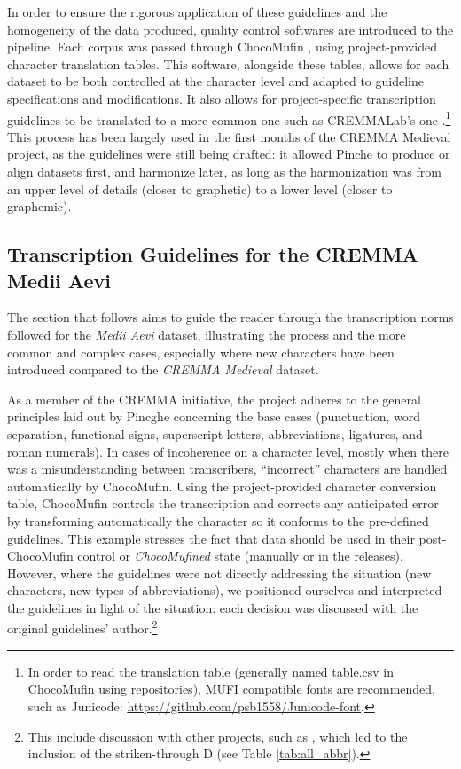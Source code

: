 \documentclass{article}
\begin{document}
In order to ensure the rigorous application of these guidelines and the homogeneity of the data produced, quality control softwares are introduced to the pipeline. Each corpus was passed through ChocoMufin \citep{Clerice_Choco-Mufin_a_tool_2021}, using project-provided character translation tables. This software, alongside these tables, allows for each dataset to be both controlled at the character level and adapted to guideline specifications and modifications. It also allows for project-specific transcription guidelines to be translated to a more common one such as CREMMALab’s one \citep{pinche2022cremmalab}.\footnote{In order to read the translation  table (generally named table.csv in ChocoMufin using repositories), MUFI compatible fonts are recommended, such as Junicode: \url{https://github.com/psb1558/Junicode-font}.} This process has been largely used in the first months of the CREMMA Medieval project, as the guidelines were still being drafted: it allowed Pinche to produce or align datasets first, and harmonize later, as long as the harmonization was from an upper level of details (closer to graphetic) to a lower level (closer to graphemic).

\subsection{Transcription Guidelines for the CREMMA Medii Aevi}

The section that follows aims to guide the reader through the transcription norms followed for the \textit{Medii Aevi} dataset, illustrating the process and the more common and complex cases, especially where new characters have been introduced compared to the \textit{CREMMA Medieval} dataset.

As a member of the CREMMA initiative, the project adheres to the general principles laid out by Pincghe \cite[Tables pp.~4-15]{pinche:hal-03697382} concerning the base cases (punctuation, word separation, functional signs, superscript letters, abbreviations, ligatures, and roman numerals). In cases of incoherence on a character level, mostly when there was a misunderstanding between transcribers, \enquote{incorrect} characters are handled automatically by ChocoMufin. Using the project-provided character conversion table, ChocoMufin controls the transcription and corrects any anticipated error by transforming automatically the character so it conforms to the pre-defined guidelines. This example stresses the fact that data should be used in their post-ChocoMufin control or \textit{ChocoMufined} state (manually or in the releases). However, where the guidelines were not directly addressing the situation (new characters, new types of abbreviations), we positioned ourselves and interpreted the guidelines in light of the situation: each decision was discussed with the original guidelines' author.\footnote{This include discussion with other projects, such as \cite{textasimages}, which led to the inclusion of the striken-through D (see Table \ref{tab:all_abbr}).}
\end{document}
